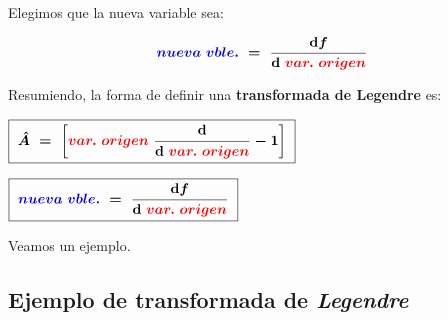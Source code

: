 Elegimos que la nueva variable sea:

\begin{equation}
\ \boldsymbol{
 \displaystyle \textcolor{blue}{nueva \ vble.} \ = \ \dv{f}{\ \textcolor{red}{var.\ origen}}
} 		
\end{equation}

Resumiendo, la forma de definir una \textbf{transformada de Legendre} es:

\begin{multicols}{2}
$\boxed{ \ \boldsymbol{
\hat A \ = \ \displaystyle \left[ \textcolor{red}{var.\ origen}\ \dv{\ \textcolor{red}{var.\ origen}} - 1 \right]
} \ }$

$\boxed{ \ \boldsymbol{
 \displaystyle \textcolor{blue}{nueva \ vble.} \ = \ \dv{f}{\ \textcolor{red}{var.\ origen}}
} \ }$	
\end{multicols}

Veamos un ejemplo.

\subsection{Ejemplo de transformada de \emph{Legendre}}
\vspace{0.5cm}

